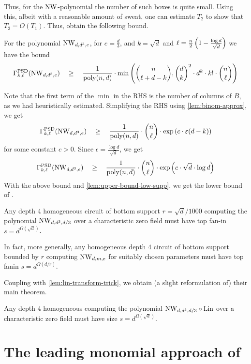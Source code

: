 Thus, for the $\mathrm{NW}$-polynomial the number of such boxes is quite small. Using this, albeit with a reasonable amount of sweat, one can estimate $T_2$ to show that $T_2 = O(T_1)$. Thus, \cite{KLSS} obtain the following bound. 

\begin{lemma}
For the polynomial $\mathrm{NW}_{d,d^3,e}$, for $e = \frac{d}{3}$, and $k = \sqrt{d}$ and $\ell = \frac{n}{2}\left(1 - \frac{\log d}{\sqrt{d}}\right)$ we have the bound
\[
\Gamma^{\mathrm{PSD}}_{k,\ell}(\mathrm{NW}_{d,d^3,e}) \quad \geq \quad \frac{1}{\mathrm{poly}(n,d)} \cdot \min\left(\binom{n}{\ell + d - k}, \binom{d}{k}^2 \cdot d^k \cdot k! \cdot \binom{n}{\ell}\right)
\]
\end{lemma}
Note that the first term of the $\min$ in the RHS is the number of columns of $B$, as we had heuristically estimated. Simplifying the RHS using \autoref{lem:binom-approx}, we get
\[
\Gamma^{\mathrm{PSD}}_{k,\ell}(\mathrm{NW}_{d,d^3,e}) \quad \geq \quad \frac{1}{\mathrm{poly}(n,d)} \cdot \binom{n}{\ell}\cdot \exp\left(c\cdot \varepsilon (d - k)\right)
\]
for some constant $c > 0$. Since $\epsilon = \frac{\log d}{\sqrt{d}}$, we get 
\[
\Gamma^{\mathrm{PSD}}_{k,\ell}(\mathrm{NW}_{d,d^3,e}) \quad \geq \quad \frac{1}{\mathrm{poly}(n,d)} \cdot \binom{n}{\ell}\cdot \exp\left(c\cdot \sqrt{d}\cdot \log d\right)
\]
With the above bound and \autoref{lem:upper-bound-low-supp}, we get the lower bound of \cite{KLSS}. 
\begin{theorem}\label{thm:KLSS-lowsupp}
Any depth $4$ homogeneous circuit of bottom support $r = \sqrt{d}/1000$ computing the polynomial $\mathrm{NW}_{d,d^3,d/3}$ over a characteristic zero field must have top fan-in $s = d^{\Omega(\sqrt{d})}$. 

In fact, more generally, any homogeneous depth $4$ circuit of bottom support bounded by $r$ computing $\mathrm{NW}_{d,m,e}$ for suitably chosen parameters must have top fanin $s = d^{\Omega(d/r)}$. 
\end{theorem}

Coupling with \autoref{lem:lin-transform-trick}, we obtain (a slight reformulation of) their main theorem. 

\begin{theorem}\label{thm:KLSS-main}
Any depth $4$ homogeneous computing the polynomial $\mathrm{NW}_{d,d^3,d/3}\circ \mathrm{Lin}$ over a characteristic zero field must have size $s = d^{\Omega(\sqrt{d})}$. 
\end{theorem}

\section{The leading monomial approach of \cite{KS14}}

